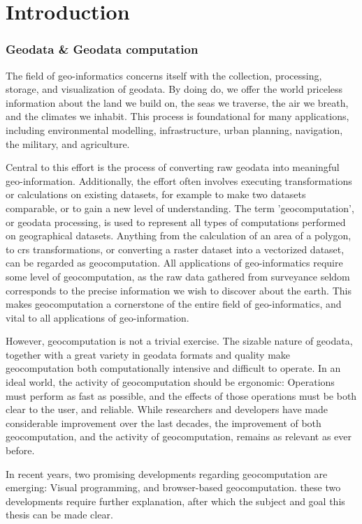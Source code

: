 \chapter{Introduction}

\subsection*{Geodata \& Geodata computation}

The field of geo-informatics concerns itself with the collection, processing, storage, and visualization of geodata. 
By doing do, we offer the world priceless information about the land we build on, the seas we traverse, the air we breath, and the climates we inhabit. 
This process is foundational for many applications, including environmental modelling, infrastructure, urban planning, navigation, the military, and agriculture.   

Central to this effort is the process of converting raw geodata into meaningful geo-information. 
Additionally, the effort often involves executing transformations or calculations on existing datasets, for example to make two datasets comparable, or to gain a new level of understanding.  
The term 'geocomputation', or geodata processing, is used to represent all types of computations performed on geographical datasets. Anything from the calculation of an area of a polygon, to \ac{crs} transformations, or converting a raster dataset into a vectorized dataset, can be regarded as geocomputation.
All applications of geo-informatics require some level of geocomputation, as the raw data gathered from surveyance seldom corresponds to the precise information we wish to discover about the earth.       
This makes geocomputation a cornerstone of the entire field of geo-informatics, and vital to all applications of geo-information.

However, geocomputation is not a trivial exercise. The sizable nature of geodata, together with a great variety in geodata formats and quality make geocomputation both computationally intensive and difficult to operate. 
In an ideal world, the activity of geocomputation should be ergonomic: Operations must perform as fast as possible, and the effects of those operations must be both clear to the user, and reliable.
While researchers and developers have made considerable improvement over the last decades, the improvement of both geocomputation, and the activity of geocomputation, remains as relevant as ever before. 

In recent years, two promising developments regarding geocomputation are emerging:
Visual programming, and browser-based geocomputation. 
these two developments require further explanation, after which the subject and goal this thesis can be made clear.

